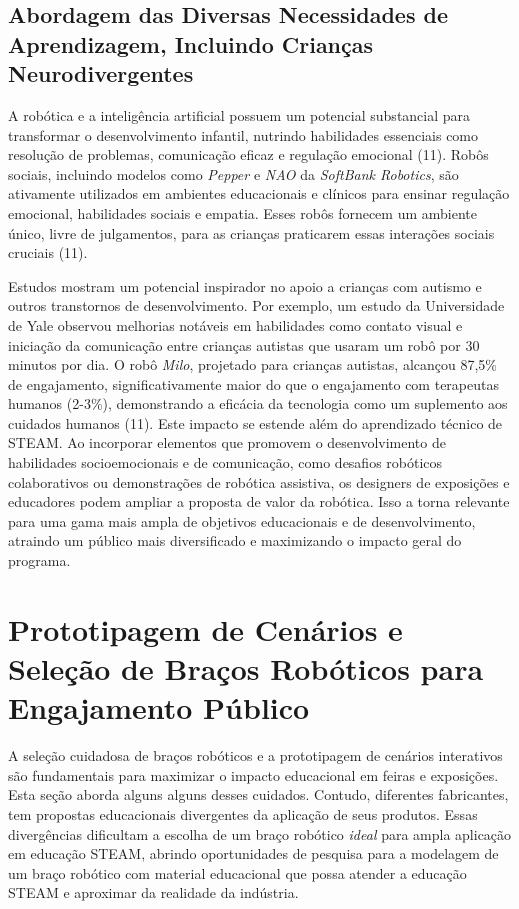 \documentclass[%
  a4paper,%
  12pt,%
  fleqn,%
  english,%
  brazilian,%
]{article}
\begin{document}
\subsection{Abordagem das Diversas Necessidades de Aprendizagem, Incluindo Crianças Neurodivergentes}
A robótica e a inteligência artificial possuem um potencial substancial para transformar o desenvolvimento infantil, nutrindo habilidades essenciais como resolução de problemas, comunicação eficaz e regulação emocional (11). Robôs sociais, incluindo modelos como \emph{Pepper} e \emph{NAO} da \textit{SoftBank Robotics}, são ativamente utilizados em ambientes educacionais e clínicos para ensinar regulação emocional, habilidades sociais e empatia. Esses robôs fornecem um ambiente único, livre de julgamentos, para as crianças praticarem essas interações sociais cruciais (11).

Estudos mostram um potencial inspirador no apoio a crianças com autismo e outros transtornos de desenvolvimento. Por exemplo, um estudo da Universidade de Yale observou melhorias notáveis em habilidades como contato visual e iniciação da comunicação entre crianças autistas que usaram um robô por 30 minutos por dia. O robô \emph{Milo}, projetado para crianças autistas, alcançou 87,5\% de engajamento, significativamente maior do que o engajamento com terapeutas humanos (2-3\%), demonstrando a eficácia da tecnologia como um suplemento aos cuidados humanos (11). Este impacto se estende além do aprendizado técnico de STEAM. Ao incorporar elementos que promovem o desenvolvimento de habilidades socioemocionais e de comunicação, como desafios robóticos colaborativos ou demonstrações de robótica assistiva, os designers de exposições e educadores podem ampliar a proposta de valor da robótica. Isso a torna relevante para uma gama mais ampla de objetivos educacionais e de desenvolvimento, atraindo um público mais diversificado e maximizando o impacto geral do programa.

\section{Prototipagem de Cenários e Seleção de Braços Robóticos para Engajamento Público}
A seleção cuidadosa de braços robóticos e a prototipagem de cenários interativos são fundamentais para maximizar o impacto educacional em feiras e exposições. Esta seção aborda alguns alguns desses cuidados. Contudo, diferentes fabricantes, tem propostas educacionais divergentes da aplicação de seus produtos. Essas divergências dificultam a escolha de um braço robótico \emph{ideal} para ampla aplicação em educação STEAM, abrindo oportunidades de pesquisa para a modelagem de um braço robótico com material educacional que possa atender a educação STEAM e aproximar da realidade da indústria.
\end{document}
